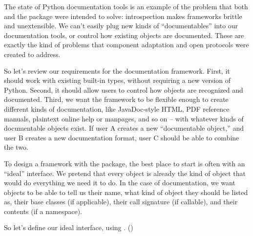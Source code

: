 The state of Python documentation tools is an example of the problem that both
 and the  package were intended to solve:
introspection makes frameworks brittle and unextensible.  We can't easily plug
new kinds of ``documentables'' into our documentation tools, or control how
existing objects are documented.  These are exactly the kind of problems that
component adaptation and open protocols were created to address.

So let's review our requirements for the documentation framework.  First, it
should work with existing built-in types, without requiring a new version of
Python.  Second, it should allow users to control how objects are recognized
and documented.  Third, we want the framework to be flexible enough to create
different kinds of documentation, like JavaDoc-style HTML, PDF reference
manuals, plaintext online help or manpages, and so on -- with whatever kinds of
documentable objects exist.  If user A creates a new ``documentable object,''
and user B creates a new documentation format, user C should be able to combine
the two.




To design a framework with the  package, the best place to
start is often with an ``ideal'' interface.  We pretend that every object is
already the kind of object that would do everything we need it to do.  In the
case of documentation, we want objects to be able to tell us their name, what
kind of object they should be listed as, their base classes (if applicable),
their call signature (if callable), and their contents (if a namespace).

So let's define our ideal interface, using .
()

